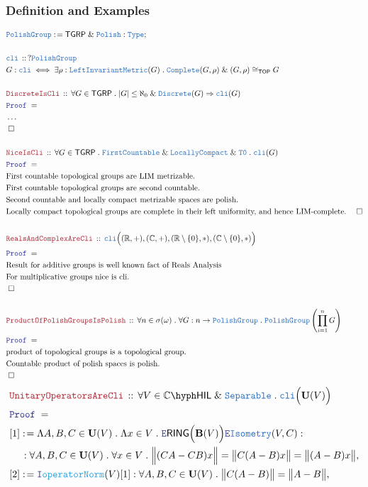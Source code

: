 \documentclass[12pt]{scrartcl}
\newcommand{\TYPE}[1]{\textcolor{NavyBlue}{\mathtt{#1}}}
\newcommand{\FUNC}[1]{\textcolor{Cerulean}{\mathtt{#1}}}
\newcommand{\LOGIC}[1]{\textcolor{Blue}{\mathtt{#1}}}
\newcommand{\THM}[1]{\textcolor{Maroon}{\mathtt{#1}}}
\renewcommand{\.}{\; . \;}
\newcommand{\de}{: \kern 0.1pc =}
\newcommand{\Theorem}[2]{& \THM{#1} \, :: \, #2 \\ & \Proof = \\ }
\newcommand{\DeclareType}[2]{& \TYPE{#1} \, :: \, #2 \\}
\newcommand{\DefineType}[3]{& #1 : \TYPE{#2} \iff #3 \\}
\newcommand{\NewLine}{\\ & \kern 1pc}
\newcommand{\Page}[1]{ \begin{align*} #1 \end{align*}   }
\newcommand{\NoProof}{ & \ldots \\ \EndProof}
\renewcommand{\And}{\; \& \;}
\newcommand{\Imply}{\Rightarrow}
\newcommand{\Type}{\TYPE{Type}}
\newcommand{\Reals}{\mathbb{R} }
\newcommand{\Complex}{\mathbb{C}}
\newcommand{\Say}[3]{& #1 \de #2 : #3, \\}
\newcommand{\Conclude}[3]{& #1 \de #2 : #3; \\}
\newcommand{\Intro}{\LOGIC{I}}
\newcommand{\Elim}{\LOGIC{E}}
\newcommand{\QED}{\; \square}
\newcommand{\EndProof}{& \QED \\}
\newcommand{\Proof}{\LOGIC{Proof} \; }
\newcommand{\Separable}{\TYPE{Separable}}
\newcommand{\LC}{\TYPE{LocallyCompact}}
\newcommand{\TOP}{\mathsf{TOP}}
\newcommand{\Complete}{\TYPE{Complete}}
\newcommand{\Polish}{\TYPE{Polish}}
\newcommand{\HIL}[1]{#1\hyph\textsf{HIL}}
\newcommand{\LIM}{\TYPE{LeftInvariantMetric}}
\newcommand{\PG}{\TYPE{PolishGroup}}
\newcommand{\cli}{\TYPE{cli}}
\newcommand{\TGRP}{\mathsf{TGRP}}
\begin{document}
\subsubsection{Definition and Examples}
\Page{
	\Conclude{\PG}{\TGRP \And \Polish}{\Type}
	\\
	\DeclareType{\cli}{?\PG}
	\DefineType{G}{\cli}
	{
		\exists \rho : \LIM(G) \.
		\Complete(G,\rho) \And (G,\rho) \cong_\TOP G
	}
	\\
	\Theorem{DiscreteIsCli}
	{
		\forall G \in \TGRP \.
		|G| \le \aleph_0 \And \TYPE{Discrete}(G)
		\Imply
		\cli(G)
	}
	\NoProof
	\\
	\Theorem{NiceIsCli}
	{
		\forall G \in \TGRP \.
		\TYPE{FirstCountable} 
		\And
		\LC
		\And
		\TYPE{T0} \.
		\cli(G)
	}
	& \text{First countable topological groups are LIM metrizable.} \\
	& \text{First countable topological groups are second countable.}\\
	& \text{Second countable and locally compact metrizable spaces are polish.}\\
	& \text{Locally compact topological groups are complete in their left uniformity,
		and hence LIM-complete.}
	\EndProof
	\\
	\Theorem{RealsAndComplexAreCli}
	{
		\cli\Big(
			(\Reals,+),
			(\Complex,+),
			(\Reals\setminus\{0\},*),
			(\Complex\setminus\{0\},*)
		\Big)	
	}
	& \text{Result for additive groups is well known fact of Reals Analysis} \\
	& \text{For multiplicative groups nice is cli.}\\  
	\EndProof
	\\
	\Theorem{ProductOfPolishGroupsIsPolish}
	{
		\forall n \in \sigma(\omega) \.
		\forall G : n \to \PG \.
		\PG\left( \prod^n_{i=1} G\right)
	}
	&\text{product of topological groups is a topological group.} \\
	&\text{Countable product  of polish spaces is polish.}\\
	\EndProof
}\Page{
	\Theorem{UnitaryOperatorsAreCli}
	{
		\forall V \in \HIL{\Complex} \And \Separable \.
		\cli\Big(\mathbf{U}(V)\Big)	
	}
	\Say{[1]}
	{
		\Lambda A,B,C \in \mathbf{U}(V) \.
		\Lambda x \in V \.
		\Elim \mathsf{RING} \Big( \mathbf{B}(V) \Big)
		\Elim \TYPE{Isometry}(V,C)
	}
	{
		\NewLine :		
		\forall A,B,C \in \mathbf{U}(V) \.
		\forall x \in V \.
		\Big\| (CA - CB)x \Big\|  =
		\big\| C(A - B)x \big\|  =
		\big\|(A - B)x\big\|
	}
	\Say{[2]}{\Intro \FUNC{operatorNorm}(V)[1]}
	{
		\forall A,B,C \in \mathbf{U}(V) \.
		\big\| C(A - B)\big\| = \big\| A - B \big\|
}}
\end{document}
